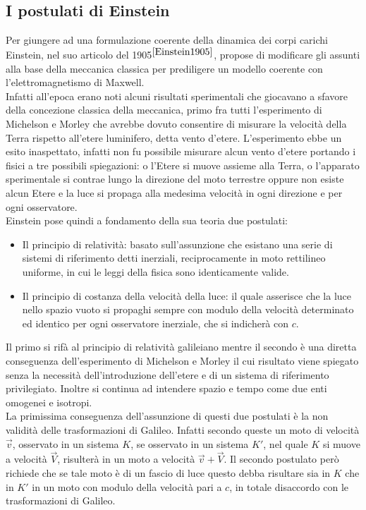 \subsection{I postulati di Einstein}\label{Sec:postulati}
Per giungere ad una formulazione coerente della dinamica dei corpi carichi Einstein, nel suo articolo del 1905$^{\cite{Einstein1905}}$, propose di modificare gli assunti alla base della meccanica classica per prediligere un modello coerente con l'elettromagnetismo di Maxwell.\\Infatti all'epoca erano noti alcuni risultati sperimentali che giocavano a sfavore della concezione classica della meccanica, primo fra tutti l'esperimento di Michelson e Morley che avrebbe dovuto consentire di misurare la velocità della Terra rispetto all'etere luminifero, detta vento d'etere. L'esperimento ebbe un esito inaspettato, infatti non fu possibile misurare alcun vento d'etere portando i fisici a tre possibili spiegazioni: o l'Etere si muove assieme alla Terra, o l'apparato sperimentale si contrae lungo la direzione del moto terrestre oppure non esiste alcun Etere e la luce si propaga alla medesima velocità in ogni direzione e per ogni osservatore.\\

Einstein pose quindi a fondamento della sua teoria due postulati:
\begin{itemize}
    \item Il principio di relatività: basato sull'assunzione che esistano  una serie di sistemi di riferimento detti inerziali, reciprocamente in moto rettilineo uniforme, in cui le leggi della fisica sono identicamente valide.
    \item Il principio di costanza della velocità della luce: il quale asserisce che la luce nello spazio vuoto si propaghi sempre con modulo della velocità determinato ed identico per ogni osservatore inerziale, che si indicherà con $c$. 
\end{itemize}
Il primo si rifà al principio di relatività galileiano mentre il secondo è una diretta conseguenza dell'esperimento di Michelson e Morley il cui risultato viene spiegato senza la necessità dell'introduzione dell'etere e di un sistema di riferimento privilegiato. Inoltre si continua ad intendere spazio e tempo come due enti omogenei e isotropi.\\

La primissima conseguenza dell'assunzione di questi due postulati è la non validità delle trasformazioni di Galileo. Infatti secondo queste un moto di velocità $\vec{v}$, osservato in un sistema $K$, se osservato in un sistema $K'$, nel quale $K$ si muove a velocità $\vec{V}$, risulterà in un moto a velocità $\vec{v}+\vec{V}$. Il secondo postulato però richiede che se tale moto è di un fascio di luce questo debba risultare sia in $K$ che in $K'$ in un moto con modulo della velocità pari a $c$, in totale disaccordo con le trasformazioni di Galileo.\\

